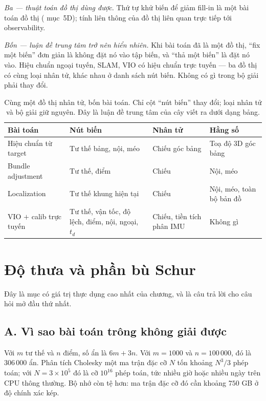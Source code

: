 \documentclass[../../vslam.tex]{subfiles}
\begin{document}
\emph{Ba --- thuật toán đồ thị dùng được.} Thứ tự khử biến để giảm fill-in là một bài toán đồ thị ( mục~5D); tính liên thông của đồ thị liên quan trực tiếp tới observability.

\emph{Bốn --- luận đề trung tâm trở nên hiển nhiên.} Khi bài toán đã là một đồ thị, ``fix một biến'' đơn giản là không đặt nó vào tập biến, và ``thả một biến'' là đặt nó vào. Hiệu chuẩn ngoại tuyến, SLAM, VIO có hiệu chuẩn trực tuyến --- ba đồ thị có cùng loại nhân tử, khác nhau ở danh sách nút biến. Không có gì trong bộ giải phải thay đổi.

\begin{table}[H]\centering\small
\caption{Cùng một đồ thị nhân tử, bốn bài toán. Chỉ cột ``nút biến'' thay đổi; loại nhân tử và bộ giải giữ nguyên. Đây là luận đề trung tâm của cây viết ra dưới dạng bảng.}
\label{tab:a04-cung-do-thi}
\begin{tabularx}{\linewidth}{@{}L{2.6cm}L{4.2cm}YL{2.4cm}@{}}
\toprule
\textbf{Bài toán} & \textbf{Nút biến} & \textbf{Nhân tử} & \textbf{Hằng số}\\
\midrule
Hiệu chuẩn từ target & Tư thế bảng, nội, méo & Chiếu góc bảng & Toạ độ \(3\)D góc bảng\\
Bundle adjustment & Tư thế, điểm & Chiếu & Nội, méo\\
Localization & Tư thế khung hiện tại & Chiếu & Nội, méo, toàn bộ bản đồ\\
VIO \(+\) calib trực tuyến & Tư thế, vận tốc, độ lệch, điểm, nội, ngoại, \(t_d\) & Chiếu, tiền tích phân IMU & Không gì\\
\bottomrule
\end{tabularx}
\end{table}

\section{Độ thưa và phần bù Schur}

Đây là mục có giá trị thực dụng cao nhất của chương, và là câu trả lời cho câu hỏi mở đầu thứ nhất.

\subsection{A. Vì sao bài toán trông không giải được}

Với \(m\) tư thế và \(n\) điểm, số ẩn là \(6m + 3n\). Với \(m = 1000\) và \(n = 100\,000\), đó là \(306\,000\) ẩn. Phân tích Cholesky một ma trận đặc cỡ \(N\) tốn khoảng \(N^3/3\) phép toán; với \(N = 3\times 10^5\) đó là cỡ \(10^{16}\) phép toán, tức nhiều giờ hoặc nhiều ngày trên CPU thông thường. Bộ nhớ còn tệ hơn: ma trận đặc cỡ đó cần khoảng \(750\) GB ở độ chính xác kép.
\end{document}
